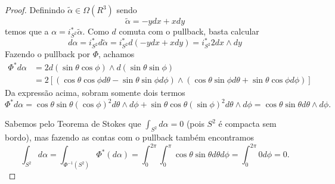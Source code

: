 \begin{problem}
    \label{prob:l4:2}
\end{problem}
\begin{proof}
    Definindo $\tilde{\alpha} \in \Omega(R^3)$ sendo 
    \[
        \tilde{\alpha} = -ydx + xdy
    \]
    temos que a $\alpha = i_{S^2}^*\tilde{\alpha}$. Como $d$ comuta com o pullback, basta calcular
    \[
        d\alpha = i_{S^2}^* d \tilde{\alpha} = i_{S^2}^* d(-ydx + xdy) = i_{S^2}^* 2dx \wedge dy
    \]
    Fazendo o pullback por $\Phi$, achamos 
    \begin{align*}
        \Phi^*d\alpha &= 2 d(\sin\theta \cos\phi) \wedge d(\sin\theta \sin\phi)\\
        &= 2[ (\cos\theta \cos\phi d\theta - \sin\theta\sin\phi d\phi) \wedge (\cos\theta\sin\phi d\theta + \sin\theta\cos\phi d\phi)]
    \end{align*}
    Da expressão acima, sobram somente dois termos
    \[
    \Phi^*d\alpha = \cos\theta\sin\theta(\cos\phi)^2 d\theta \wedge d\phi + \sin\theta\cos\theta (\sin\phi)^2 d\theta\wedge d\phi = 
    \cos\theta\sin\theta d\theta \wedge d\phi.
    \]
    
    Sabemos pelo Teorema de Stokes que $\int_{S^2} d\alpha = 0$ (pois $S^2$ é compacta sem bordo), mas fazendo as contas com o pullback também encontramos
    \[
       \int_{S^2} d\alpha = \int_{\Phi^{-1}(S^2)} \Phi^*(d\alpha) = \int_0^{2\pi}\int_0^{\pi} \cos\theta \sin\theta  d\theta d\phi = \int_{0}^{2\pi} 0 d\phi = 0.
    \]
    
\end{proof}

